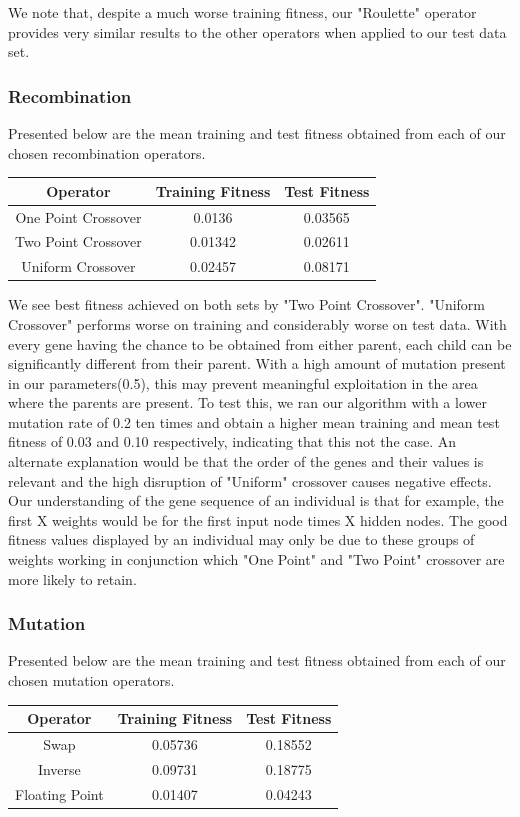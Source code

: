 \documentclass[sigconf]{acmart}
\begin{document}
We note that, despite a much worse training fitness, our "Roulette" operator provides very similar results to the other operators when applied to our test data set.
\subsubsection{Recombination}
Presented below are the mean training and test fitness obtained from each of our chosen recombination operators.
\begin{center}
\begin{tabular} {|c|c|c|}
\hline
Operator & Training Fitness & Test Fitness \\
\hline
One Point Crossover & 0.0136 & 0.03565 \\
Two Point Crossover & 0.01342 & 0.02611 \\
Uniform Crossover & 0.02457 & 0.08171 \\

\hline

\end{tabular}
\end{center}

We see best fitness achieved on both sets by "Two Point Crossover". "Uniform Crossover" performs worse on training and considerably worse on test data. With every gene having the chance to be obtained from either parent, each child can be significantly different from their parent. With a high amount of mutation present in our parameters(0.5), this may prevent meaningful exploitation in the area where the parents are present. To test this, we ran our algorithm with a lower mutation rate of 0.2 ten times and obtain a higher mean training and mean test fitness of 0.03 and 0.10 respectively, indicating that this not the case. An alternate explanation would be that the order of the genes and their values is relevant and the high disruption of "Uniform" crossover causes negative effects. Our understanding of the gene sequence of an individual is that for example, the first X weights would be for the first input node times X hidden nodes. The good fitness values displayed by an individual may only be due to these groups of weights working in conjunction which "One Point" and "Two Point" crossover are more likely to retain.

\subsubsection{Mutation}
Presented below are the mean training and test fitness obtained from each of our chosen mutation operators.
\begin{center}
\begin{tabular} {|c|c|c|}
\hline
Operator & Training Fitness & Test Fitness \\
\hline
Swap & 0.05736 & 0.18552 \\
Inverse & 0.09731 & 0.18775 \\
Floating Point & 0.01407 & 0.04243 \\

\hline

\end{tabular}
\end{center}
\end{document}
